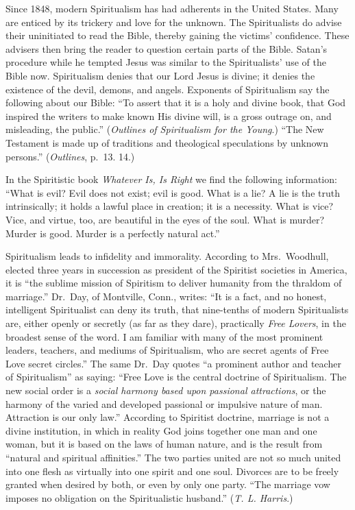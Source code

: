 \documentclass[
]{book}
\begin{document}
Since 1848, modern Spiritualism has had adherents in the United States. Many are enticed by its trickery and love for the unknown. The Spiritualists do advise their uninitiated to read the Bible, thereby gaining the victims' confidence. These advisers then bring the reader to question certain parts of the Bible. Satan's procedure while he tempted Jesus was similar to the Spiritualists' use of the Bible now. Spiritualism denies that our Lord Jesus is divine; it denies the existence of the devil, demons, and angels. Exponents of Spiritualism say the following about our Bible: ``To assert that it is a holy and divine book, that God inspired the writers to make known His divine will, is a gross outrage on, and misleading, the public.'' (\emph{Outlines of Spiritualism for the Young}.) ``The New Testament is made up of traditions and theological speculations by unknown persons.'' (\emph{Outlines}, p.~13. 14.)

In the Spiritistic book \emph{Whatever Is, Is Right} we find the following information: ``What is evil? Evil does not exist; evil is good. What is a lie? A lie is the truth intrinsically; it holds a lawful place in creation; it is a necessity. What is vice? Vice, and virtue, too, are beautiful in the eyes of the soul. What is murder? Murder is good. Murder is a perfectly natural act.''

Spiritualism leads to infidelity and immorality. According to Mrs.~Woodhull, elected three years in succession as president of the Spiritist societies in America, it is ``the sublime mission of Spiritism to deliver humanity from the thraldom of marriage.'' Dr.~Day, of Montville, Conn., writes: ``It is a fact, and no honest, intelligent Spiritualist can deny its truth, that nine-tenths of modern Spiritualists are, either openly or secretly (as far as they dare), practically \emph{Free Lovers}, in the broadest sense of the word. I am familiar with many of the most prominent leaders, teachers, and mediums of Spiritualism, who are secret agents of Free Love secret circles.'' The same Dr.~Day quotes ``a prominent author and teacher of Spiritualism'' as saying: ``Free Love is the central doctrine of Spiritualism. The new social order is a \emph{social harmony based upon passional attractions}, or the harmony of the varied and developed passional or impulsive nature of man. Attraction is our only law.'' According to Spiritist doctrine, marriage is not a divine institution, in which in reality God joins together one man and one woman, but it is based on the laws of human nature, and is the result from ``natural and spiritual affinities.'' The two parties united are not so much united into one flesh as virtually into one spirit and one soul. Divorces are to be freely granted when desired by both, or even by only one party. ``The marriage vow imposes no obligation on the Spiritualistic husband.'' (\emph{T. L. Harris}.)
\end{document}
